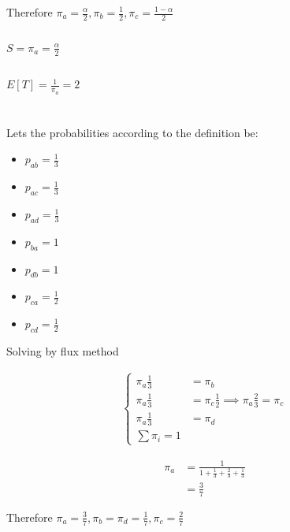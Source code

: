 \documentclass[12pt, a4paper]{article}
\begin{document}
Therefore $\pi_a = \frac{\alpha}{2}, \pi_b = \frac{1}{2}, \pi_c = \frac{1-\alpha}{2}$

\subsection{}
\subsection{}
$S = \pi_a = \frac{\alpha}{2}$
\subsection{}
$E[T] = \frac{1}{\pi_a} = 2$

\section{}
Lets the probabilities according to the definition be:
\begin{itemize}
  \item $p_{ab} = \frac{1}{3}$
  \item $p_{ac} = \frac{1}{3}$
  \item $p_{ad} = \frac{1}{3}$
  \item $p_{ba} = 1$
  \item $p_{db} = 1$
  \item $p_{ca} = \frac{1}{2}$
  \item $p_{cd} = \frac{1}{2}$
\end{itemize}

Solving by flux method

\begin{subequations}
  \begin{align}
    \begin{cases} 
      \pi_a \frac{1}{3} &= \pi_b\\
      \pi_a \frac{1}{3} &= \pi_c \frac{1}{2} \implies \pi_a \frac{2}{3} = \pi_c\\
      \pi_a \frac{1}{3} &= \pi_d\\
      \sum \pi_i = 1
    \end{cases}
  \end{align}
\end{subequations}

\begin{subequations}
  \begin{align}
    \pi_a &= \frac{1}{1+\frac{1}{3}+\frac{2}{3}+\frac{1}{3}}\\
          &= \frac{3}{7}
  \end{align}
\end{subequations}

Therefore $\pi_a = \frac{3}{7}, \pi_b = \pi_d = \frac{1}{7}, \pi_c = \frac{2}{7}$
\end{document}
